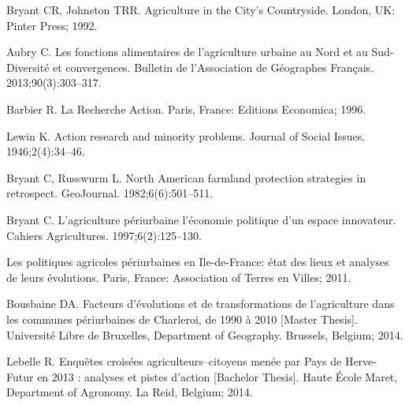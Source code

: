 \documentclass[10pt,a4paper]{article}
\renewcommand*{\refname}{References and Notes}
\begin{document}
\begin{multicols}{2}

%
%

\begin{thebibliography}{10}

Bryant CR, Johnston TRR.
\newblock Agriculture in the City's Countryside.
\newblock London, UK: Pinter Press; 1992.

Aubry C.
\newblock Les fonctions alimentaires de l'agriculture urbaine au Nord et au
  Sud-Diversit{\'e} et convergences.
\newblock Bulletin de l'Association de G{\'e}ographes Fran{\c{c}}ais.
  2013;90(3):303--317.

Barbier R.
\newblock La Recherche Action.
\newblock Paris, France: Editions Economica; 1996.

Lewin K.
\newblock Action research and minority problems.
\newblock Journal of Social Issues. 1946;2(4):34--46.


Bryant C, Russwurm L.
\newblock North American farmland protection strategies in retrospect.
\newblock GeoJournal. 1982;6(6):501--511.

Bryant C.
\newblock L’agriculture p{\'e}riurbaine l’{\'e}conomie politique d’un
  espace innovateur.
\newblock Cahiers Agricultures. 1997;6(2):125--130.

Les politiques agricoles périurbaines en Ile-de-France: état des lieux et
  analyses de leurs évolutions.
\newblock Paris, France: Association of Terres en Villes; 2011.

Bousbaine DA.
\newblock Facteurs d’évolutions et de transformations de l’agriculture
  dans les communes périurbaines de Charleroi, de 1990 à 2010 [Master
  Thesis].
\newblock Université Libre de Bruxelles, Department of Geography. Brussels,
  Belgium; 2014.

Lebelle R.
\newblock Enquêtes croisées agriculteurs–citoyens menée par Pays de
  Herve-Futur en 2013 : analyses et pistes d’action [Bachelor Thesis].
\newblock Haute École Maret, Department of Agronomy. La Reid, Belgium; 2014.


\end{thebibliography}
\end{multicols}
\end{document}
